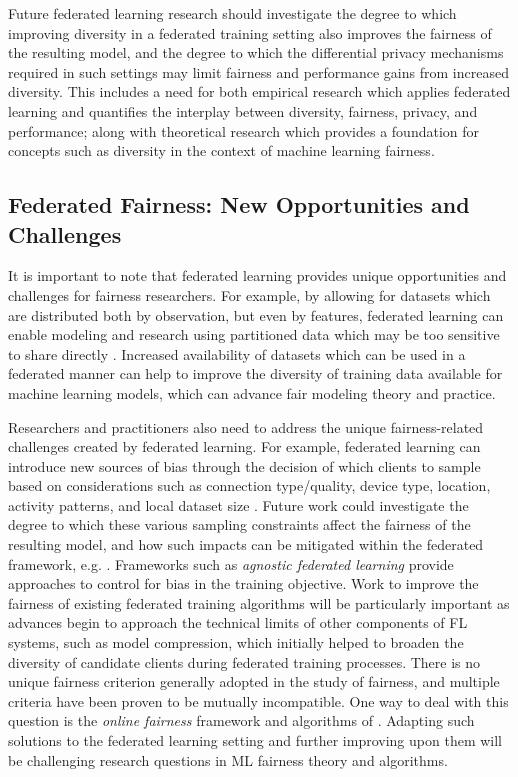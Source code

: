 \documentclass[11pt]{article}
\begin{document}
Future federated learning research should investigate the degree to which improving diversity in a federated training setting also improves the fairness of the resulting model, and the degree to which the differential privacy mechanisms required in such settings may limit fairness and performance gains from increased diversity. This includes a need for both empirical research which applies federated learning and quantifies the interplay between diversity, fairness, privacy, and performance; along with theoretical research which provides a foundation for concepts such as diversity in the context of machine learning fairness.

\subsection{Federated Fairness: New Opportunities and Challenges}\label{subsec:federated-fairness-new-challenges-opportunities}

It is important to note that federated learning provides unique opportunities and challenges for fairness researchers. For example, by allowing for datasets which are distributed both by observation, but even by features, federated learning can enable modeling and research using partitioned data which may be too sensitive to share directly \cite{gupta2018distributed, Hardy2017-da}. Increased availability of datasets which can be used in a federated manner can help to improve the diversity of training data available for machine learning models, which can advance fair modeling theory and practice.

Researchers and practitioners also need to address the unique fairness-related challenges created by federated learning. For example, federated learning can introduce new sources of bias through the decision of which clients to sample based on considerations such as connection type/quality, device type, location, activity patterns, and local dataset size \cite{bonawitz19sysml}. Future work could investigate the degree to which these various sampling constraints affect the fairness of the resulting model, and how such impacts can be mitigated within the federated framework, e.g. \cite{li2019fair,fair_quantile,moreau}. Frameworks such as \emph{agnostic federated learning} \cite{Mohri2019} provide approaches to control for bias in the training objective. Work to improve the fairness of existing federated training algorithms will be particularly important as advances begin to approach the technical limits of other components of FL systems, such as model compression, which initially helped to broaden the diversity of candidate clients during federated training processes. There is no unique fairness criterion generally adopted in 
the study of fairness, and multiple criteria have been proven to be mutually incompatible. One way to deal with this
question is the \emph{online fairness} framework and algorithms of \citet{AwasthiCortesMansourMohri2020}.
Adapting such solutions to the federated learning setting and further improving upon them will be challenging
research questions in ML fairness theory and algorithms.
\end{document}
